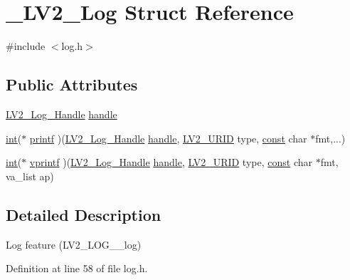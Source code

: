 \hypertarget{struct___l_v2___log}{}\section{\+\_\+\+L\+V2\+\_\+\+Log Struct Reference}
\label{struct___l_v2___log}


{\ttfamily \#include $<$log.\+h$>$}

\subsection*{Public Attributes}
\begin{DoxyCompactItemize}
\item 
\hyperlink{lv2_2lv2_2lv2_2lv2plug_8in_2ns_2ext_2log_2log_8h_a9326ee1167aafc845cb0e88da769b251}{L\+V2\+\_\+\+Log\+\_\+\+Handle} \hyperlink{struct___l_v2___log_a4c547e1347a0decc4e2101eda1164576}{handle}
\item 
\hyperlink{xmltok_8h_a5a0d4a5641ce434f1d23533f2b2e6653}{int}($\ast$ \hyperlink{struct___l_v2___log_a77d41303c80d440153a1dbd42a30d618}{printf} )(\hyperlink{lv2_2lv2_2lv2_2lv2plug_8in_2ns_2ext_2log_2log_8h_a9326ee1167aafc845cb0e88da769b251}{L\+V2\+\_\+\+Log\+\_\+\+Handle} \hyperlink{struct___l_v2___log_a4c547e1347a0decc4e2101eda1164576}{handle}, \hyperlink{urid_8h_a5ff0630d245539e9f6dca10ff3c40fae}{L\+V2\+\_\+\+U\+R\+ID} type, \hyperlink{getopt1_8c_a2c212835823e3c54a8ab6d95c652660e}{const} char $\ast$fmt,...)
\item 
\hyperlink{xmltok_8h_a5a0d4a5641ce434f1d23533f2b2e6653}{int}($\ast$ \hyperlink{struct___l_v2___log_afdee0feb8249a20100862610dc6eaccd}{vprintf} )(\hyperlink{lv2_2lv2_2lv2_2lv2plug_8in_2ns_2ext_2log_2log_8h_a9326ee1167aafc845cb0e88da769b251}{L\+V2\+\_\+\+Log\+\_\+\+Handle} \hyperlink{struct___l_v2___log_a4c547e1347a0decc4e2101eda1164576}{handle}, \hyperlink{urid_8h_a5ff0630d245539e9f6dca10ff3c40fae}{L\+V2\+\_\+\+U\+R\+ID} type, \hyperlink{getopt1_8c_a2c212835823e3c54a8ab6d95c652660e}{const} char $\ast$fmt, va\+\_\+list ap)
\end{DoxyCompactItemize}


\subsection{Detailed Description}
Log feature (L\+V2\+\_\+\+L\+O\+G\+\_\+\+\_\+log) 

Definition at line 58 of file log.\+h.



